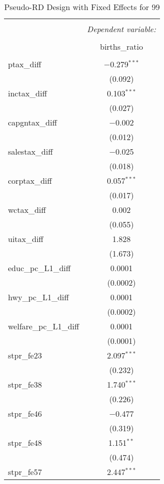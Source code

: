 
\begin{table}[!htbp] \centering 
  \caption{Pseudo-RD Design with Fixed Effects for  99} 
  \label{} 
\begin{tabular}{@{\extracolsep{5pt}}lc} 
\\[-1.8ex]\hline 
\hline \\[-1.8ex] 
 & \multicolumn{1}{c}{\textit{Dependent variable:}} \\ 
\cline{2-2} 
\\[-1.8ex] & births\_ratio \\ 
\hline \\[-1.8ex] 
 ptax\_diff & $-$0.279$^{***}$ \\ 
  & (0.092) \\ 
  inctax\_diff & 0.103$^{***}$ \\ 
  & (0.027) \\ 
  capgntax\_diff & $-$0.002 \\ 
  & (0.012) \\ 
  salestax\_diff & $-$0.025 \\ 
  & (0.018) \\ 
  corptax\_diff & 0.057$^{***}$ \\ 
  & (0.017) \\ 
  wctax\_diff & 0.002 \\ 
  & (0.055) \\ 
  uitax\_diff & 1.828 \\ 
  & (1.673) \\ 
  educ\_pc\_L1\_diff & 0.0001 \\ 
  & (0.0002) \\ 
  hwy\_pc\_L1\_diff & 0.0001 \\ 
  & (0.0002) \\ 
  welfare\_pc\_L1\_diff & 0.0001 \\ 
  & (0.0001) \\ 
  stpr\_fe23 & 2.097$^{***}$ \\ 
  & (0.232) \\ 
  stpr\_fe38 & 1.740$^{***}$ \\ 
  & (0.226) \\ 
  stpr\_fe46 & $-$0.477 \\ 
  & (0.319) \\ 
  stpr\_fe48 & 1.151$^{**}$ \\ 
  & (0.474) \\ 
  stpr\_fe57 & 2.447$^{***}$ \\ 

\end{tabular}
\end{table}

